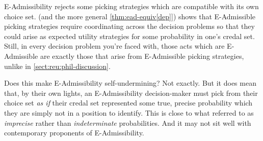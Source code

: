 \documentclass[a4paper]{article}
\newcommand\EU{\mathrm{EU}}
\newcommand{\IB}{\mathbb{B}}
\renewcommand{\color}[1]{}
\newenvironment{colored}[1]{\leavevmode\color{#1}}{}
\newenvironment{CCM rewritten}
{\begingroup\color{blue}} %
{\endgroup}              %
\begin{document}

\begin{colored}{red}
	 E-Admissibility rejects some picking strategies which are compatible with its own choice set. %
   (and the more general \cref{thm:ead-equiv[dep]}) shows that E-Admissible picking strategies require coordinating across the decision problems so that they could arise as expected utility strategies for some probability in one's credal set. Still, in every decision problem you're faced with, those acts which are E-Admissible are exactly those that arise from E-Admissible picking strategies, unlike in \cref{sect:reu:phil-discussion}.

\end{colored}


Does this make E-Admissibility self-undermining? Not exactly. But it does mean that, by their own lights, an E-Admissibility decision-maker must pick from their choice set \emph{as if} their credal set represented some true, precise probability which they are simply not in a position to identify. This is close to what \cite{levi99} referred to as \emph{imprecise} rather than \emph{indeterminate} probabilities. And it may not sit well with contemporary proponents of E-Admissibility.



	
\end{document}
